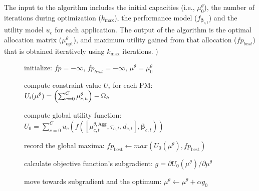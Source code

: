 The input to the algorithm includes the initial capacities (i.e., $\mu^\theta_0$), the number of iterations during optimization ($k_{\text{max}}$), the performance model ($f_{\boldsymbol\beta_{c,t}}$) and the utility model $u_c$ for each application. 
The output of the algorithm is the optimal allocation matrix ($\mu^\theta_{\text{opt}}$), and maximum utility gained from that allocation ($fp_{best}$) that is obtained iteratively using $k_{\text{max}}$ iterations. )
 \begin{figure} 
\begin{algorithm}[H]  
	\small
	\SetAlgoVlined
  \SetAlFnt{\tiny}
\footnotesize{}

initialize: $fp=-\infty$, $fp_{best} =-\infty$, $\mu^\theta=\mu^\theta_0$

{
	compute constraint value $U_i$ for each PM:
	$U_i(\mu^\theta)=\left(\sum_{c=0}^{C}{\mu^\theta_{c,h}}\right)-\Omega_h $

	{
		compute global utility function:
		$U_0 = \sum_{c=0}^{C}  u_c(f(\left[\mu^{\theta,\text{Agg}}_{c,t},\tau_{c,t},d_{c,t}\right],\boldsymbol\beta_{c,t})) $

		record the global maxima: %
		$fp_{\text{best}} \gets max(U_0(\mu^\theta), fp_{\text{best}})$ 

		calculate objective function's subgradient:%
			$g=\partial U_0(\mu^\theta) / \partial \mu^\theta $

		move towards subgradient and the optimum: %
		$  \mu^\theta \gets \mu^\theta + \alpha g_0$
	}
	}
\end{algorithm}
\end{figure}
